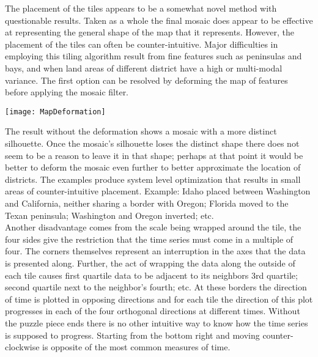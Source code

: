 \documentclass[a4paper,man,natbib]{apa6}
\begin{document}
	The placement of the tiles appears to be a somewhat novel method with questionable results. Taken as a whole the final mosaic does appear to be effective at representing the general shape of the map that it represents. However, the placement of the tiles can often be counter-intuitive. Major difficulties in employing this tiling algorithm result from fine features such as peninsulas and bays, and when land areas of different district have a high or multi-modal variance. The first option can be resolved by deforming the map of features before applying the mosaic filter. \vspace{1em}
	
	\begin{minipage}{\linewidth}
		\begin{center}
			\texttt{[image: MapDeformation]}
		\end{center}
	\end{minipage}\vspace{2em}

	The result without the deformation shows a mosaic with a more distinct silhouette. Once the mosaic's silhouette loses the distinct shape there does not seem to be a reason to leave it in that shape; perhaps at that point it would be better to deform the mosaic even further to better approximate the location of districts. The examples produce system level optimization that results in small areas of counter-intuitive placement. Example: Idaho placed between Washington and California, neither sharing a border with Oregon; Florida moved to the Texan peninsula; Washington and Oregon inverted; etc. \\
	
	Another disadvantage comes from the scale being wrapped around the tile, the four sides give the restriction that the time series must come in a multiple of four. The corners themselves represent an interruption in the axes that the data is presented along. Further, the act of wrapping the data along the outside of each tile causes first quartile data to be adjacent to its neighbors 3rd quartile; second quartile next to the neighbor's fourth; etc. At these borders the direction of time is plotted in opposing directions and for each tile the direction of this plot progresses in each of the four orthogonal directions at different times. Without the puzzle piece ends there is no other intuitive way to know how the time series is supposed to progress. Starting from the bottom right and moving counter-clockwise is opposite of the most common measures of time. \\
	
\end{document}
